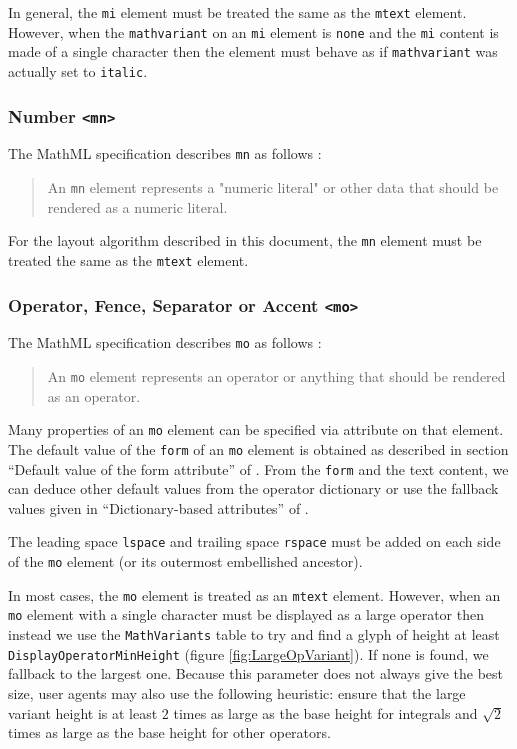 In general, the {\tt mi} element must be treated the same as the {\tt mtext}
element. However, when the {\tt mathvariant} on an {\tt mi} element is
{\tt none} and the {\tt mi} content is made of a single character then the
element must behave as if {\tt mathvariant} was actually set to {\tt italic}.

\subsubsection{Number {\tt <mn>}}

The MathML specification describes {\tt mn} as follows \cite{MathML3}:
%
\begin{quote}
  An {\tt mn} element represents a "numeric literal" or other data that should
  be rendered as a numeric literal.
\end{quote}

For the layout algorithm described in this document, the
{\tt mn} element must be treated the same as the {\tt mtext} element.

\subsubsection{Operator, Fence, Separator or Accent {\tt <mo>}}\label{Operators}

The MathML specification describes {\tt mo} as follows \cite{MathML3}:
%
\begin{quote}
  An {\tt mo} element represents an operator or anything that should be
  rendered as an operator.
\end{quote}

Many properties of an {\tt mo} element can be specified via attribute on
that element. The default value of the {\tt form} of an {\tt mo} element is
obtained as described in section ``Default value of the form attribute'' of
\cite{MathML3}. From the {\tt form} and the text content, we can deduce other
default values from the operator dictionary or use the fallback values given
in ``Dictionary-based attributes'' of \cite{MathML3}.

The leading space {\tt lspace} and trailing space {\tt rspace} must be added on
each side of the {\tt mo} element (or its outermost embellished ancestor).

In most cases, the {\tt mo} element is treated as an {\tt mtext} element.
However, when an {\tt mo} element with a single character must be displayed as
a large operator then instead we use the {\tt MathVariants}
table to try and find a glyph of height at least
{\tt DisplayOperatorMinHeight}
(figure \ref{fig:LargeOpVariant}). If none is found, we fallback to the
largest one. Because this parameter does not always give
the best size, user agents may also use the following heuristic: ensure
that the large variant height is at least $2$ times as large as the base height
for integrals and $\sqrt{2}$ times as large as the base height for other
operators.

